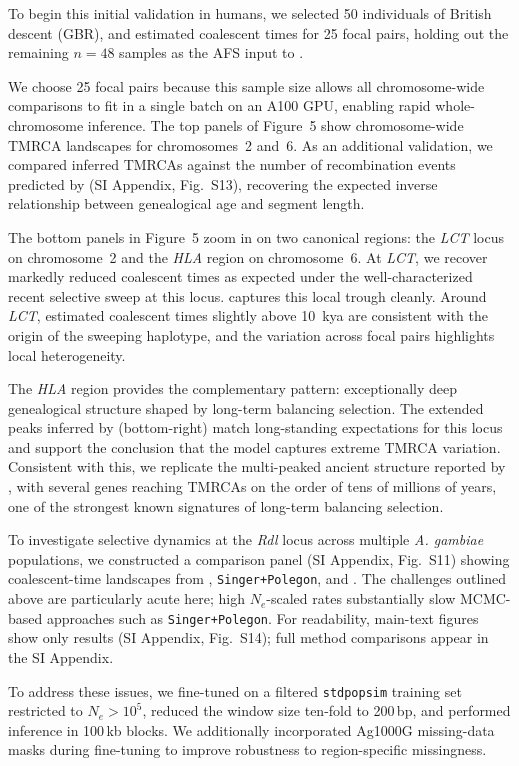 \documentclass[9pt,twocolumn,twoside]{pnas-new}
\begin{document}
To begin this initial validation in humans, 
we selected 50 individuals of British descent (GBR), 
and estimated coalescent times for 25 focal pairs, 
holding out the remaining $n=48$ samples as the AFS input to \cxtkit. 


We choose 25 focal pairs 
because this sample size allows all chromosome-wide comparisons to fit in a single batch on an A100 GPU,
enabling rapid whole-chromosome inference. 
The top panels of Figure~5 
show chromosome-wide TMRCA landscapes for chromosomes~2 and~6. 
As an additional validation, 
we compared inferred TMRCAs against the number of recombination events predicted by \cxtkit (SI Appendix, Fig.~S13),
recovering the expected inverse relationship between genealogical age and segment length.


The bottom panels in Figure~5
zoom in on two canonical regions: 
the \emph{LCT} locus on chromosome~2 
and the \emph{HLA} region on chromosome~6. 
At \emph{LCT}, we recover markedly reduced coalescent times
as expected under the well-characterized recent selective sweep at this locus. 
\cxtkit captures this local trough cleanly.
Around \emph{LCT}, estimated coalescent times slightly above 10~kya 
are consistent with the origin of the sweeping haplotype, 
and the variation across focal pairs highlights local heterogeneity.

The \emph{HLA} region provides the complementary pattern: 
exceptionally deep genealogical structure shaped by long-term balancing selection. 
The extended peaks inferred by \cxtkit (bottom-right)
match long-standing expectations for this locus 
and support the conclusion that the model captures extreme TMRCA variation.
Consistent with this, 
we replicate the multi-peaked ancient structure reported by \cite{deng2025general},
with several genes reaching TMRCAs on the order of tens of millions of years,
one of the strongest known signatures of long-term balancing selection.


To investigate selective dynamics at the \emph{Rdl} locus across multiple \emph{A. gambiae} populations,
we constructed a comparison panel (SI Appendix, Fig.~S11) showing coalescent-time landscapes
from \cxtkit, \texttt{Singer+Polegon}, and \smcpp.
The challenges outlined above are particularly acute here;
high $N_e$-scaled rates substantially slow MCMC-based approaches such as \texttt{Singer+Polegon}.
For readability, main-text figures show only \cxtkit results (SI Appendix, Fig.~S14);
full method comparisons appear in the SI Appendix.

To address these issues,
we fine-tuned \cxtkit on a filtered \texttt{stdpopsim} training set restricted to $N_e > 10^5$,
reduced the window size ten-fold to 200\,bp,
and performed inference in 100\,kb blocks.
We additionally incorporated Ag1000G missing-data masks during fine-tuning
to improve robustness to region-specific missingness.
\end{document}
